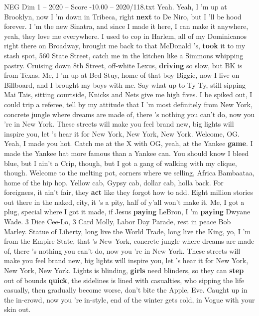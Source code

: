 \begin{textsample}{NEG Dim 1 – 2020 – Score -10.00 – 2020/118.txt}  \label{ex:f1_neg_032}
Yeah.
Yeah, I 'm up at Brooklyn, now I 'm down in Tribeca, right \textbf{next} to De Niro, but I 'll be hood forever.
I 'm the new Sinatra, and since I made it here, I can make it anywhere, yeah, they love me everywhere.
I used to cop in Harlem, all of my Dominicanos right there on Broadway, brought me back to that McDonald 's, \textbf{took} it to my stash spot, 560 State Street, catch me in the kitchen like a Simmons whipping pastry.
Cruising down 8th Street, off-white Lexus, \textbf{driving} so slow, but BK is from Texas.
Me, I 'm up at Bed-Stuy, home of that boy Biggie, now I live on Billboard, and I brought my boys with me.
Say what up to Ty Ty, still sipping Mai Tais, sitting courtside, Knicks and Nets give me high fives.
I be spiked out, I could trip a referee, tell by my attitude that I 'm most definitely from New York, concrete jungle where dreams are made of, there 's nothing you can't do, now you 're in New York.
These streets will make you feel brand new, big lights will inspire you, let 's hear it for New York, New York, New York.
Welcome, OG.
Yeah, I made you hot.
Catch me at the X with OG, yeah, at the Yankee \textbf{game}.
I made the Yankee hat more famous than a Yankee can.
You should know I bleed blue, but I ain't a Crip, though, but I got a gang of walking with my clique, though.
Welcome to the melting pot, corners where we selling, Africa Bambaataa, home of the hip hop.
Yellow cab, Gypsy cab, dollar cab, holla back.
For foreigners, it ain't fair, they \textbf{act} like they forgot how to add.
Eight million stories out there in the naked, city, it 's a pity, half of y'all won't make it.
Me, I got a plug, special where I got it made, if Jesus \textbf{paying} LeBron, I 'm \textbf{paying} Dwyane Wade. 3 Dice Cee-Lo, 3 Card Molly, Labor Day Parade, rest in peace Bob Marley.
Statue of Liberty, long live the World Trade, long live the King, yo, I 'm from the Empire State, that 's New York, concrete jungle where dreams are made of, there 's nothing you can't do, now you 're in New York.
These streets will make you feel brand new, big lights will inspire you, let 's hear it for New York, New York, New York.
Lights is blinding, \textbf{girls} need blinders, so they can \textbf{step} out of bounds \textbf{quick}, the sidelines is lined with casualties, who sipping the life casually, then gradually become worse, don't bite the Apple, Eve.
Caught up in the in-crowd, now you 're in-style, end of the winter gets cold, in Vogue with your skin out.

\end{textsample}
